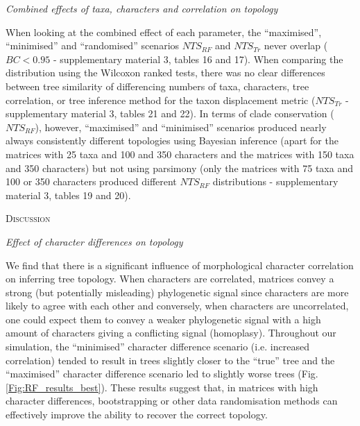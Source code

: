 \documentclass[12pt,letterpaper]{article}
\renewcommand{\section}[1]{%
\bigskip
\begin{center}
\begin{Large}
\normalfont\scshape #1
\medskip
\end{Large}
\end{center}}
\renewcommand{\subsection}[1]{%
\bigskip
\begin{center}
\begin{large}
\normalfont\itshape #1
\end{large}
\end{center}}
\begin{document}
\subsection{Combined effects of taxa, characters and correlation on topology}
When looking at the combined effect of each parameter, the ``maximised'', ``minimised'' and ``randomised'' scenarios $NTS_{RF}$ and $NTS_{Tr}$ never overlap ($BC < 0.95$ - supplementary material 3, tables 16 and 17).
When comparing the distribution using the Wilcoxon ranked tests, there was no clear differences between tree similarity of differencing numbers of taxa, characters, tree correlation, or tree inference method for the taxon displacement metric ($NTS_{Tr}$ - supplementary material 3, tables 21 and 22).
In terms of clade conservation ($NTS_{RF}$), however, ``maximised'' and ``minimised'' scenarios produced nearly always consistently different topologies using Bayesian inference (apart for the matrices with 25 taxa and 100 and 350 characters and the matrices with 150 taxa and 350 characters) but not using parsimony (only the matrices with 75 taxa and 100 or 350 characters produced different $NTS_{RF}$ distributions - supplementary material 3, tables 19 and 20).

\section{Discussion}

\subsection{Effect of character differences on topology}
We find that there is a significant influence of morphological character correlation on inferring tree topology.
When characters are correlated, matrices convey a strong (but potentially misleading) phylogenetic signal since characters are more likely to agree with each other and conversely, when characters are uncorrelated, one could expect them to convey a weaker phylogenetic signal with a high amount of characters giving a conflicting signal (homoplasy).
Throughout our simulation, the ``minimised'' character difference scenario (i.e. increased correlation) tended to result in trees slightly closer to the ``true'' tree and the ``maximised'' character difference scenario led to slightly worse trees (Fig. \ref{Fig:RF_results_best}).
These results suggest that, in matrices with high character differences, bootstrapping or other data randomisation methods can effectively improve the ability to recover the correct topology.
\end{document}
